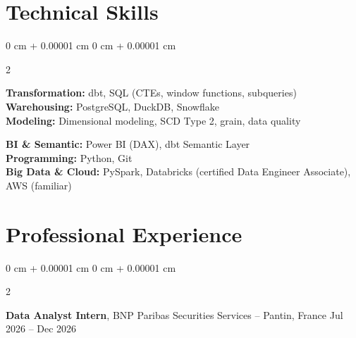 \documentclass[10pt, letterpaper]{article}
\newenvironment{onecolentry}{
    \begin{adjustwidth}{
        0 cm + 0.00001 cm
    }{
        0 cm + 0.00001 cm
    }
}{
    \end{adjustwidth}
} %
\newenvironment{twocolentry}[2][]{
    \onecolentry
    \def\secondColumn{#2}
    \setcolumnwidth{\fill, 3.8 cm}
    \begin{paracol}{2}
}{
    \switchcolumn \raggedleft \secondColumn
    \end{paracol}
    \endonecolentry
} %
\begin{document}
    \section{Technical Skills}
        \begin{onecolentry}
        \begin{paracol}{2}

        \textbf{Transformation:} dbt, SQL (CTEs, window functions,
        subqueries) \\
        \textbf{Warehousing:} PostgreSQL, DuckDB, Snowflake \\
        \textbf{Modeling:} Dimensional modeling, SCD Type 2, grain,
        data quality

        \switchcolumn

        \textbf{BI \& Semantic:} Power BI (DAX), dbt Semantic Layer \\
        \textbf{Programming:} Python, Git \\
        \textbf{Big Data \& Cloud:} PySpark, Databricks (certified Data Engineer Associate), AWS (familiar)

        \end{paracol}
        \end{onecolentry}

        \vspace{0.2 cm}

    \section{Professional Experience}
        \begin{twocolentry}{
            Jul 2026 – Dec 2026
        }
            \textbf{Data Analyst Intern}, BNP Paribas Securities Services -- Pantin, France\end{twocolentry}
\end{document}
